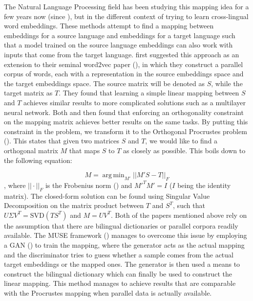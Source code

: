 \documentclass[12pt]{extreport}
\DeclareMathOperator*{\argmin}{arg\,min}
\begin{document}
The Natural Language Processing field has been studying this mapping idea for a few years now (since \cite{mikolov2013distributed}), but in the different context of trying to learn cross-lingual word embeddings. These methods attempt to find a mapping between embeddings for a source language and embeddings for a target language such that a model trained on the source language embeddings can also work with inputs that come from the target language. \cite{mikolov2013distributed} first suggested this approach as an extension to their seminal word2vec paper (\cite{word2vec}), in which they construct a parallel corpus of words, each with a representation in the source embeddings space and the target embeddings space. The source matrix will be denoted as $S$, while the target matrix as $T$. They found that learning a simple linear mapping between $S$ and $T$ achieves similar results to more complicated solutions such as a multilayer neural network. Both \cite{normalized-word-embbedings} and \cite{principle-bilingual-mappings} then found that enforcing an orthogonality constraint on the mapping matrix achieves better results on the same tasks. By putting this constraint in the problem, we transform it to the Orthogonal Procrustes problem (\cite{procrustes}). This states that given two matrices $S$ and $T$, we would like to find a orthogonal matrix $M$ that maps $S$ to $T$ as closely as possible. This boils down to the following equation:

\begin{equation}
    M = \argmin_{M'} ||M' S - T ||_F
\end{equation}
, where $|| \cdot ||_F$ is the Frobenius norm (\cite{wiki:matrix}) and $M'^T M' = I$ ($I$ being the identity matrix). The closed-form solution can be found using Singular Value Decomposition on the matrix product between $T$ and $S^T$, such that $U\Sigma V^T = \text{SVD}(TS^T)$ and $M = UV^T$. Both of the papers mentioned above rely on the assumption that there are bilingual dictionaries or parallel corpora readily available. The MUSE framework (\cite{muse}) manages to overcome this issue by employing a GAN (\cite{gan}) to train the mapping, where the generator acts as the actual mapping and the discriminator tries to guess whether a sample comes from the actual target embeddings or the mapped ones. The generator is then used a means to construct the bilingual dictionary which can finally be used to construct the linear mapping. This method manages to achieve results that are comparable with the Procrustes mapping when parallel data is actually available.
\end{document}
